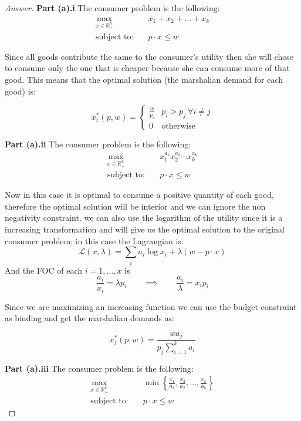 \documentclass{article}
\theoremstyle{definition}
\newcommand{\qiq}{\qquad \implies \qquad}
\begin{document}
\begin{proof}[Answer]
\textbf{Part (a).i} The consumer problem is the following:
\begin{align*}
\max_{x\in \mathbb{R}^k_+}&\quad x_{1}+x_{2}+\ldots+x_{k}\\
\text{subject to:} &\quad p\cdot x \leq w
\end{align*}


Since all goods contribute the same to the consumer's utility then she will chose to consume only the one that is cheaper because she can consume more of that good. This means that the optimal solution (the marshalian demand for each good) is:

$$x_i^*(p,w) = \left\{ \begin{array}{cc}
    \frac{w}{p_i} & p_i >p_j \: \forall i\neq j \\
     0 & \text{otherwise}
\end{array}$$

\textbf{Part (a).ii} The consumer problem is the following:
\begin{align*}
\max_{x\in \mathbb{R}^k_+}&\quad x_{1}^{a_{1}} x_{2}^{a_{2}} \cdots x_{k}^{a_{k}}  \\
\text{subject to:} &\quad p\cdot x \leq w
\end{align*}

Now in this case it is optimal to consume a positive quantity of each good, therefore the optimal solution will be interior and we can ignore the non negativity constraint. we can also use the logarithm of the utility since it is a increasing transformation and will give us the optimal solution to the original consumer problem; in this case the Lagrangian is:
$$
\mathcal{L}(x, \lambda)=\sum_{i} a_{i} \log x_{i}+\lambda(w-p \cdot x)
$$
And the FOC of each $i=1,\hdots,x$ is
$$
\frac{a_{i}}{x_{i}}=\lambda p_{i} \qiq \frac{a_{i}}{\lambda}=x_{i} p_{i}
$$

Since we are maximizing an increasing function we can use the budget constraint as binding and get the marshalian demands as:

$$x_j^*(p,w) = \frac{w a_j}{p_j\sum_{i=1}^k{a_i}}$$

\textbf{Part (a).iii} The consumer problem is the following:
\begin{align*}
\max_{x\in \mathbb{R}^k_+}&\quad \min \left\{\frac{x_{1}}{a_{1}}, \frac{x_{2}}{a_{2}}, \ldots, \frac{x_{k}}{a_{k}}\right\} \\
\text{subject to:} &\quad p\cdot x \leq w
\end{align*}


\end{proof}
\end{document}
